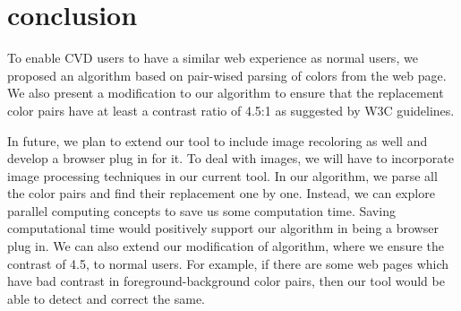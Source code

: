 \chapter{conclusion}
\thispagestyle{plain}

\label{Conclusion and future work}

To enable CVD users to have a similar web experience as normal users, we proposed an algorithm based on pair-wised parsing of colors from the web page. We also present a modification to our algorithm to ensure that the replacement color pairs have at least a contrast ratio of 4.5:1 as suggested by W3C guidelines.

In future, we plan to extend our tool to include image recoloring as well and develop a browser plug in for it. To deal with images, we will have to incorporate image processing techniques in our current tool. In our algorithm, we parse all the color pairs and find their replacement one by one. Instead, we can explore parallel computing concepts to save us some computation time. Saving computational time would positively support our algorithm in being a browser plug in. We can also extend our modification of algorithm, where we ensure the contrast of 4.5, to normal users. For example, if there are some web pages which have bad contrast in foreground-background color pairs, then our tool would be able to detect and correct the same.   